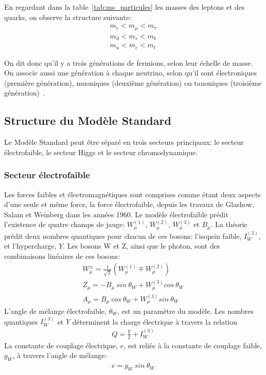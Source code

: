 En regardant dans la table~\ref{tab:ms_particules} les masses des
leptons et des quarks, on observe la structure suivante:
\begin{eqnarray}
  m_e < m_\mu < m_\tau \\
  m_d < m_s < m_b \\
  m_u < m_c < m_t 
\end{eqnarray}

On dit donc qu'il y a trois générations de fermions, selon leur
échelle de masse. On associe aussi une génération à chaque neutrino,
selon qu'il sont électroniques (première génération), muoniques
(deuxième génération) ou tauoniques (troisième
génération)~\cite{thomson_modern_2013}.

\subsection{Structure du Modèle Standard}
\label{sec:ms:th:struct}

Le Modèle Standard peut être séparé en trois secteurs principaux: le
secteur électrofaible, le secteur Higgs et le secteur chromodynamique.

\subsubsection{Secteur électrofaible}
\label{sec:ms:th:struct:ewk}

Les forces faibles et électromagnétiques sont comprises comme étant
deux aspects d'une seule et même force, la force électrofaible, depuis
les travaux de Glashow, Salam et Weinberg dans les années
1960. Le modèle électrofaible prédit
l'existence de quatre champs de jauge: $W^{(1)}_\mu$, $W^{(2)}_\mu$,
$W^{(3)}_\mu$ et $B_\mu$. La théorie prédit deux nombres quantiques
pour chacun de ces bosons: l'isopsin faible, $I^{(3)}_W$, et
l'hypercharge, $Y$. Les bosons W et Z, ainsi que le photon, sont des
combinaisons linéaires de ces bosons:
\begin{eqnarray}
  \label{eq:ewk_mix}
  W^{\pm}_\mu = \frac{1}{\sqrt{2}}(W^{(1)}_\mu \mp W^{(2)}_\mu)  \\
  Z_\mu = -B_\mu\ sin\ \theta_W + W^{(3)}_\mu cos\ \theta_W \\
  A_\mu = B_\mu\ cos\ \theta_W + W^{(3)}_\mu sin\ \theta_W
\end{eqnarray}
L'angle de mélange électrofaible, $\theta_W$, est un paramètre du
modèle. Les nombres quantiques $I^{(3)}_W$ et $Y$ déterminent la
charge électrique à travers la relation
\begin{eqnarray}
  Q = \frac{Y}{2} + I^{(3)}_W
\end{eqnarray}
La constante de couplage électrique, $e$, est reliée à la constante de
couplage faible, $g_W$, à travers l'angle de mélange:
\begin{eqnarray}
  e = g_W\ sin\ \theta_W
\end{eqnarray}

